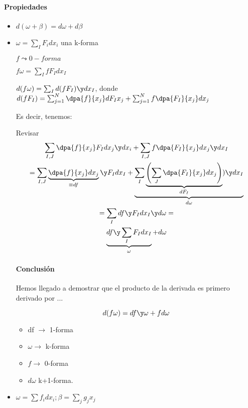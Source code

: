 \paragraph{Propiedades}
\begin{itemize}
\item $d(\omega + \beta) = d\omega + d\beta$
\item $\omega = \sum_I F_i dx_i$ una k-forma

$f\leadsto 0-forma$

$f\omega = \sum_I fF_Idx_I$

$d(f\omega) = \sum_I d(fF_I) \y dx_I$, donde $d(fF_I) = \sum_{j=1}^N \dpa{f}{x_j}dF_Ix_j + \sum_{j=1}^N f\dpa{F_I}{x_j}dx_j$

Es decir, tenemos:

Revisar
\begin{gather*}
\sum_{I,J} \dpa{f}{x_j} F_Idx_j\y dx_i + \sum_{I,J} f\dpa{F_I}{x_j}dx_j\y dx_I\\
 = \sum_{I,J} \underbrace{\dpa{f}{x_j}dx_j}_{\equiv df} \y F_Idx_I + \underbrace{\sum_{I}\underbrace{\left(\sum_J \dpa{F_I}{x_j}dx_j\right)}_{dF_I}) \y dx_I }_{d\omega}\\
 = \sum_I df\y F_I dx_I \y d\omega = \\
 \underbrace{df \y \sum_IF_Idx_I}_{\omega} + d\omega 
\end{gather*}
\paragraph{Conclusión} Hemos llegado a demostrar que el producto de la derivada es primero derivado por ...

\[d(f\omega) = df\y\omega + fd\omega\]
\begin{itemize}
\item df $\to$ 1-forma
\item $\omega \to $ k-forma
\item $f \to$ 0-forma
\item $d\omega$ k+1-forma.
\end{itemize}

\item $\omega  =\sum f_idx_i; \beta = \sum_j  g_jx_j$


\end{itemize}
